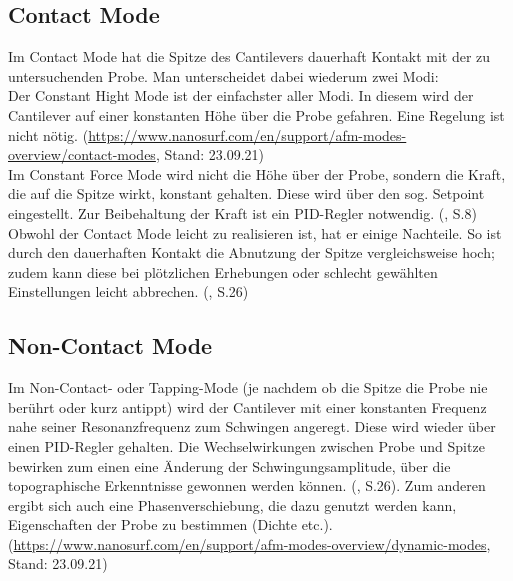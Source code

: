 \subsection{Contact Mode}
Im Contact Mode hat die Spitze des Cantilevers dauerhaft Kontakt mit der zu untersuchenden Probe. Man unterscheidet dabei wiederum zwei Modi: \\
Der Constant Hight Mode ist der einfachster aller Modi. In diesem wird der Cantilever auf einer konstanten Höhe über die Probe gefahren. 
Eine Regelung ist nicht nötig. (\url{https://www.nanosurf.com/en/support/afm-modes-overview/contact-modes}, Stand: 23.09.21) \\
Im Constant Force Mode wird nicht die Höhe über der Probe, sondern die Kraft, die auf die Spitze wirkt, konstant gehalten. Diese wird 
über den sog. Setpoint eingestellt. Zur Beibehaltung der Kraft ist ein PID-Regler notwendig. (\cite{Rieger2013}, S.8)\\
Obwohl der Contact Mode leicht zu realisieren ist, hat er einige Nachteile. So ist durch den dauerhaften Kontakt die Abnutzung der Spitze 
vergleichsweise hoch; zudem kann diese bei plötzlichen Erhebungen oder schlecht gewählten Einstellungen leicht abbrechen. (\cite{Vesely2017}, S.26)

\subsection{Non-Contact Mode}
Im Non-Contact- oder Tapping-Mode (je nachdem ob die Spitze die Probe nie berührt oder kurz antippt) wird der Cantilever mit einer 
konstanten Frequenz nahe seiner Resonanzfrequenz zum Schwingen angeregt. Diese wird wieder über einen PID-Regler gehalten. 
Die Wechselwirkungen zwischen Probe und Spitze bewirken zum einen eine Änderung der Schwingungsamplitude, über die topographische 
Erkenntnisse gewonnen werden können. (\cite{Vesely2017}, S.26). Zum anderen ergibt sich auch eine Phasenverschiebung, die dazu genutzt 
werden kann, Eigenschaften der Probe zu bestimmen (Dichte etc.). (\url{https://www.nanosurf.com/en/support/afm-modes-overview/dynamic-modes}, Stand: 23.09.21)\\
